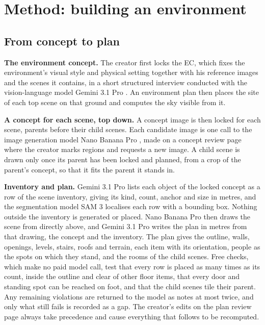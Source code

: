 \section{Method: building an environment}\label{method-building-an-environment}

\subsection{From concept to plan}\label{from-concept-to-plan}

\textbf{The environment concept.} The creator first locks the EC, which fixes the environment's visual style and physical setting together with his reference images and the scenes it contains, in a short structured interview conducted with the vision-language model Gemini 3.1 Pro \citep{gemini31pro}. An environment plan then places the site of each top scene on that ground and computes the sky visible from it.

\textbf{A concept for each scene, top down.} A concept image is then locked for each scene, parents before their child scenes. Each candidate image is one call to the image generation model Nano Banana Pro \citep{nanobananapro}, made on a concept review page where the creator marks regions and requests a new image. A child scene is drawn only once its parent has been locked and planned, from a crop of the parent's concept, so that it fits the parent it stands in.

\textbf{Inventory and plan.} Gemini 3.1 Pro lists each object of the locked concept as a row of the scene inventory, giving its kind, count, anchor and size in metres, and the segmentation model SAM 3 \citep{carion2025sam3} localises each row with a bounding box. Nothing outside the inventory is generated or placed. Nano Banana Pro then draws the scene from directly above, and Gemini 3.1 Pro writes the plan in metres from that drawing, the concept and the inventory. The plan gives the outline, walls, openings, levels, stairs, roofs and terrain, each item with its orientation, people as the spots on which they stand, and the rooms of the child scenes. Free checks, which make no paid model call, test that every row is placed as many times as its count, inside the outline and clear of other floor items, that every door and standing spot can be reached on foot, and that the child scenes tile their parent. Any remaining violations are returned to the model as notes at most twice, and only what still fails is recorded as a gap. The creator's edits on the plan review page always take precedence and cause everything that follows to be recomputed.

